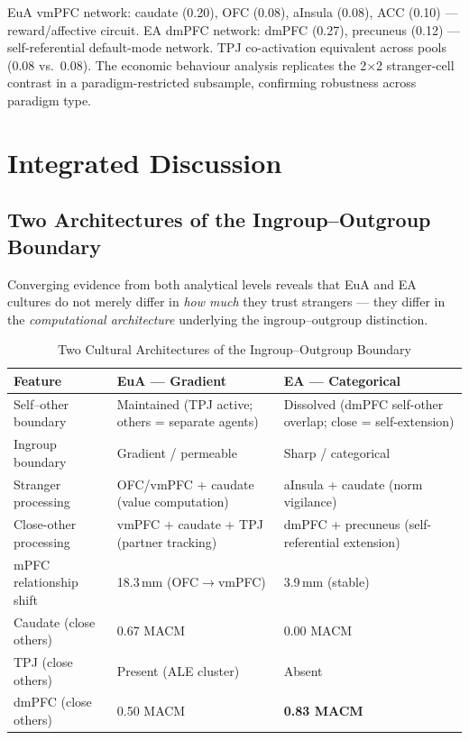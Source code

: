 \documentclass[11pt,a4paper]{report}
\begin{document}
EuA vmPFC network: caudate (0.20), OFC (0.08), aInsula (0.08), ACC (0.10) ---
reward/affective circuit. EA dmPFC network: dmPFC (0.27), precuneus (0.12) ---
self-referential default-mode network. TPJ co-activation equivalent across pools (0.08 vs.\
0.08). The economic behaviour analysis replicates the 2$\times$2 stranger-cell contrast in
a paradigm-restricted subsample, confirming robustness across paradigm type.

\chapter{Integrated Discussion}

\section*{Two Architectures of the Ingroup--Outgroup Boundary}

Converging evidence from both analytical levels reveals that EuA and EA cultures do not
merely differ in \emph{how much} they trust strangers --- they differ in the
\emph{computational architecture} underlying the ingroup--outgroup distinction.

\begin{table}[ht]
\centering\small
\caption{Two Cultural Architectures of the Ingroup--Outgroup Boundary}
\label{tab:arch}
\begin{tabular}{p{3.5cm}p{5.0cm}p{5.0cm}}
\toprule
\textbf{Feature} &
\textcolor{euaBlue}{\textbf{EuA --- Gradient}} &
\textcolor{eaRed}{\textbf{EA --- Categorical}} \\
\midrule
Self--other boundary &
Maintained (TPJ active; others = separate agents) &
Dissolved (dmPFC self-other overlap; close = self-extension) \\
Ingroup boundary & Gradient / permeable & Sharp / categorical \\
Stranger processing &
OFC/vmPFC + caudate (value computation) &
aInsula + caudate (norm vigilance) \\
Close-other processing &
vmPFC + caudate + TPJ (partner tracking) &
dmPFC + precuneus (self-referential extension) \\
mPFC relationship shift & 18.3\,mm (OFC$\to$vmPFC) & 3.9\,mm (stable) \\
Caudate (close others) & 0.67 MACM & 0.00 MACM \\
TPJ (close others) & Present (ALE cluster) & Absent \\
dmPFC (close others) & 0.50 MACM & \textbf{0.83 MACM} \\
\bottomrule
\end{tabular}
\end{table}
\end{document}
